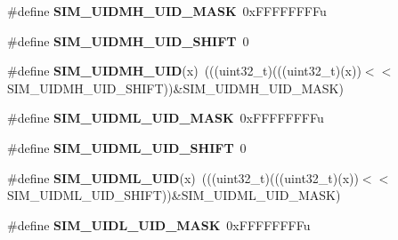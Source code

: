 \begin{DoxyCompactItemize}
\item 
\#define {\bfseries S\+I\+M\+\_\+\+U\+I\+D\+M\+H\+\_\+\+U\+I\+D\+\_\+\+M\+A\+SK}~0x\+F\+F\+F\+F\+F\+F\+F\+Fu\hypertarget{group__SIM__Register__Masks_ga38dffcb27b09a015e2f2e7812d42477c}{}\label{group__SIM__Register__Masks_ga38dffcb27b09a015e2f2e7812d42477c}

\item 
\#define {\bfseries S\+I\+M\+\_\+\+U\+I\+D\+M\+H\+\_\+\+U\+I\+D\+\_\+\+S\+H\+I\+FT}~0\hypertarget{group__SIM__Register__Masks_ga56b83da182908eb5c406181b72870e54}{}\label{group__SIM__Register__Masks_ga56b83da182908eb5c406181b72870e54}

\item 
\#define {\bfseries S\+I\+M\+\_\+\+U\+I\+D\+M\+H\+\_\+\+U\+ID}(x)~(((uint32\+\_\+t)(((uint32\+\_\+t)(x))$<$$<$S\+I\+M\+\_\+\+U\+I\+D\+M\+H\+\_\+\+U\+I\+D\+\_\+\+S\+H\+I\+FT))\&S\+I\+M\+\_\+\+U\+I\+D\+M\+H\+\_\+\+U\+I\+D\+\_\+\+M\+A\+SK)\hypertarget{group__SIM__Register__Masks_ga62269c010d4ee5e3036fea63bbe21702}{}\label{group__SIM__Register__Masks_ga62269c010d4ee5e3036fea63bbe21702}

\item 
\#define {\bfseries S\+I\+M\+\_\+\+U\+I\+D\+M\+L\+\_\+\+U\+I\+D\+\_\+\+M\+A\+SK}~0x\+F\+F\+F\+F\+F\+F\+F\+Fu\hypertarget{group__SIM__Register__Masks_ga87fba538d2482490ddfdb1ef8a44ec66}{}\label{group__SIM__Register__Masks_ga87fba538d2482490ddfdb1ef8a44ec66}

\item 
\#define {\bfseries S\+I\+M\+\_\+\+U\+I\+D\+M\+L\+\_\+\+U\+I\+D\+\_\+\+S\+H\+I\+FT}~0\hypertarget{group__SIM__Register__Masks_gacedaca5a049852ee395767e70f806c14}{}\label{group__SIM__Register__Masks_gacedaca5a049852ee395767e70f806c14}

\item 
\#define {\bfseries S\+I\+M\+\_\+\+U\+I\+D\+M\+L\+\_\+\+U\+ID}(x)~(((uint32\+\_\+t)(((uint32\+\_\+t)(x))$<$$<$S\+I\+M\+\_\+\+U\+I\+D\+M\+L\+\_\+\+U\+I\+D\+\_\+\+S\+H\+I\+FT))\&S\+I\+M\+\_\+\+U\+I\+D\+M\+L\+\_\+\+U\+I\+D\+\_\+\+M\+A\+SK)\hypertarget{group__SIM__Register__Masks_ga0eb63e00b9ee42283435043b437b8d29}{}\label{group__SIM__Register__Masks_ga0eb63e00b9ee42283435043b437b8d29}

\item 
\#define {\bfseries S\+I\+M\+\_\+\+U\+I\+D\+L\+\_\+\+U\+I\+D\+\_\+\+M\+A\+SK}~0x\+F\+F\+F\+F\+F\+F\+F\+Fu\hypertarget{group__SIM__Register__Masks_ga412340eabbcd0f0d48ce4886e9beb071}{}\label{group__SIM__Register__Masks_ga412340eabbcd0f0d48ce4886e9beb071}


\end{DoxyCompactItemize}
